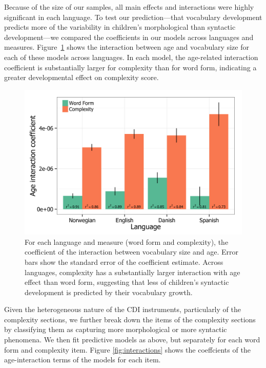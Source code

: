 \documentclass[10pt,letterpaper]{article}
\begin{document}
Because of the size of our samples, all main effects and interactions were highly significant in each language. To test our prediction---that vocabulary development predicts more of the variability in children's morphological than syntactic development---we compared the coefficients in our models across languages and measures. Figure~\ref{fig:coefs_grammar} shows the interaction between age and vocabulary size for each of these models across languages. In each model, the age-related interaction coefficient is substantially larger for complexity than for word form, indicating a greater developmental effect on complexity score. 

\begin{figure}[t]
\begin{center}
\includegraphics[width=\linewidth]{plots/coefs_wordform_complexity.png}
\end{center}
\caption{\label{fig:coefs_grammar}  For each language and measure (word form and complexity), the coefficient of the interaction between vocabulary size and age. Error bars show the standard error of the coefficient estimate. Across languages, complexity has a substantially larger interaction with age effect than word form, suggesting that less of children's syntactic development is predicted by their vocabulary growth.} 
\end{figure}

Given the heterogeneous nature of the CDI instruments, particularly of the complexity sections, we further break down the items of the complexity sections by classifying them as capturing more morphological or more syntactic phenomena. We then fit predictive models as above, but separately for each word form and complexity item. Figure \ref{fig:interactions} shows the coeffcients of the age-interaction terms of the models for each item. 
\end{document}
